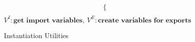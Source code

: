 \documentclass[sigplan,screen,anonymous]{acmart}
\begin{document}
\begin{figure*}[tbp]
\begin{align*}
\begin{cases*}
    \end{cases*} \\
  \end{align*}
  \hfill \footnotesize $\mathit{V}^I : \textbf{get  import variables},\: \mathit{V}^E : \textbf{create variables for exports}$
\caption{Instantiation Utilities}
\label{fig:inst-utils}
\end{figure*}






\end{document}

